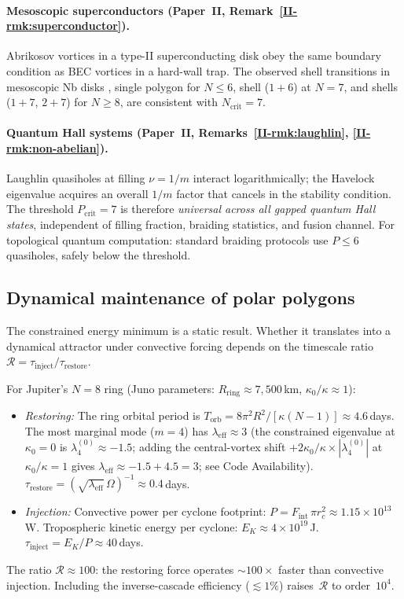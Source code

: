 \paragraph{Mesoscopic superconductors
  (Paper~II, Remark~\ref*{II-rmk:superconductor}).}
Abrikosov vortices in a type-II superconducting disk obey the
same boundary condition as BEC vortices in a hard-wall trap.
The observed shell transitions in mesoscopic Nb disks
\citep{Grigorieva2006}, single polygon for $N \le 6$,
shell ($1{+}6$) at $N = 7$, and shells ($1{+}7$, $2{+}7$)
for $N \ge 8$, are consistent with $N_{\mathrm{crit}} = 7$.

\paragraph{Quantum Hall systems
  (Paper~II, Remarks~\ref*{II-rmk:laughlin},
  \ref*{II-rmk:non-abelian}).}
Laughlin quasiholes at filling $\nu = 1/m$ interact
logarithmically; the Havelock eigenvalue acquires an
overall $1/m$ factor that cancels in the stability
condition.
The threshold $P_{\mathrm{crit}} = 7$ is therefore
\emph{universal across all gapped quantum Hall states},
independent of filling fraction, braiding statistics,
and fusion channel.
For topological quantum computation: standard braiding
protocols use $P \le 6$ quasiholes, safely below
the threshold.

\subsection{Dynamical maintenance of polar polygons}
\label{sec:dynamical-maintenance}

The constrained energy minimum is a static result.
Whether it translates into a dynamical attractor under
convective forcing depends on the timescale ratio
$\mathcal{R} = \tau_{\mathrm{inject}}/\tau_{\mathrm{restore}}$.

For Jupiter's $N = 8$ ring (Juno parameters:
$R_{\mathrm{ring}} \approx 7{,}500$\,km,
$\kappa_0/\kappa \approx 1$):
\begin{itemize}
\item \emph{Restoring:}
  The ring orbital period is
  $T_{\mathrm{orb}} = 8\pi^2 R^2/[\kappa(N{-}1)]
  \approx 4.6$\,days.
  The most marginal mode ($m = 4$) has
  $\lambda_{\mathrm{eff}} \approx 3$
  (the constrained eigenvalue at $\kappa_0 = 0$ is
  $\lambda_4^{(0)} \approx -1.5$; adding the central-vortex
  shift $+2\kappa_0/\kappa \times |\lambda_4^{(0)}|$ at
  $\kappa_0/\kappa = 1$ gives
  $\lambda_{\mathrm{eff}} \approx -1.5 + 4.5 = 3$;
  see Code Availability).
  $\tau_{\mathrm{restore}}
  = (\sqrt{\lambda_{\mathrm{eff}}}\,\Omega)^{-1}
  \approx 0.4$\,days.
\item \emph{Injection:}
  Convective power per cyclone footprint:
  $P = F_{\mathrm{int}}\,\pi r_c^2
  \approx 1.15 \times 10^{13}$\,W.
  Tropospheric kinetic energy per cyclone:
  $E_K \approx 4 \times 10^{19}$\,J.
  $\tau_{\mathrm{inject}} = E_K/P \approx 40$\,days.
\end{itemize}
The ratio $\mathcal{R} \approx 100$: the restoring force
operates ${\sim}100\times$ faster than convective injection.
Including the inverse-cascade efficiency
($\lesssim 1\%$) raises~$\mathcal{R}$ to order~$10^4$.


